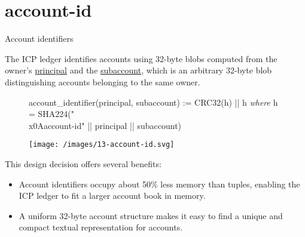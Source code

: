 \documentclass{article}
\begin{document}
\section{account-id}{Account identifiers}

The ICP ledger identifies accounts using 32-byte blobs computed from the owner's \href{https://internetcomputer.org/docs/current/references/ic-interface-spec/#principal}{principal} and the \href{/posts/09-fungible-tokens-101.html#subaccounts}{subaccount}, which is an arbitrary 32-byte blob distinguishing accounts belonging to the same owner.
\begin{figure}
\begin{code}[pseudocode]
account_identifier(principal, subaccount) := CRC32(h) || h
    \emph{where} h = SHA224("\\x0Aaccount-id" || principal || subaccount)
\end{code}
\end{figure}

\begin{figure}[grayscale-diagram]
\texttt{[image: /images/13-account-id.svg]}
\end{figure}

This design decision offers several benefits:
\begin{itemize}
  \item
    Account identifiers occupy about 50\% less memory than  tuples, enabling the ICP ledger to fit a larger account book in memory.
  \item
    A uniform 32-byte account structure makes it easy to find a unique and compact textual representation for accounts.
\end{itemize}
\end{document}
